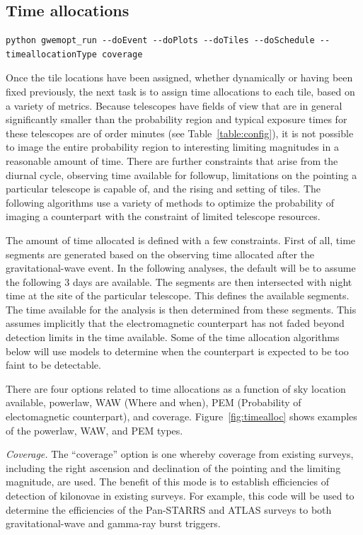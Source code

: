 \documentclass[twocolumn]{aastex62}
\begin{document}
\subsection{Time allocations}
\label{subsection:timeallocation}
\begin{lstlisting}
python gwemopt_run --doEvent --doPlots --doTiles --doSchedule --timeallocationType coverage
\end{lstlisting}
Once the tile locations have been assigned, whether dynamically or having been fixed previously, the next task is to assign time allocations to each tile, based on a variety of metrics. 
Because telescopes have fields of view that are in general significantly smaller than the probability region and typical exposure times for these telescopes are of order minutes (see Table~\ref{table:config}), it is not possible to image the entire probability region to interesting limiting magnitudes in a reasonable amount of time.
There are further constraints that arise from the diurnal cycle, observing time available for followup, limitations on the pointing a particular telescope is capable of, and the rising and setting of tiles.
The following algorithms use a variety of methods to optimize the probability of imaging a counterpart with the constraint of limited telescope resources.

The amount of time allocated is defined with a few constraints. 
First of all, time segments are generated based on the observing time allocated after the gravitational-wave event. 
In the following analyses, the default will be to assume the following 3 days are available.
The segments are then intersected with night time at the site of the particular telescope.
This defines the available segments. 
The time available for the analysis is then determined from these segments.
This assumes implicitly that the electromagnetic counterpart has not faded beyond detection limits in the time available. Some of the time allocation algorithms below will use models to determine when the counterpart is expected to be too faint to be detectable.

There are four options related to time allocations as a function of sky location available, powerlaw, WAW (Where and when), PEM (Probability of electomagnetic counterpart), and coverage. Figure~\ref{fig:timealloc} shows examples of the powerlaw, WAW, and PEM types.

\emph{Coverage.} The ``coverage'' option is one whereby coverage from existing surveys, including the right ascension and declination of the pointing and the limiting magnitude, are used. The benefit of this mode is to establish efficiencies of detection of kilonovae in existing surveys. For example, this code will be used to determine the efficiencies of the Pan-STARRS and ATLAS surveys to both gravitational-wave and gamma-ray burst triggers.
\end{document}

